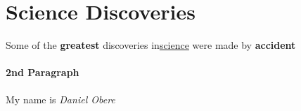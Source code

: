 \documentclass{article}
\begin{document}
	\section{Science Discoveries}
	Some of the \textbf{greatest} discoveries in\underline{science} were made by \textbf{accident}
	\paragraph{2nd Paragraph}
	My name is \emph{Daniel Obere}
\end{document}
